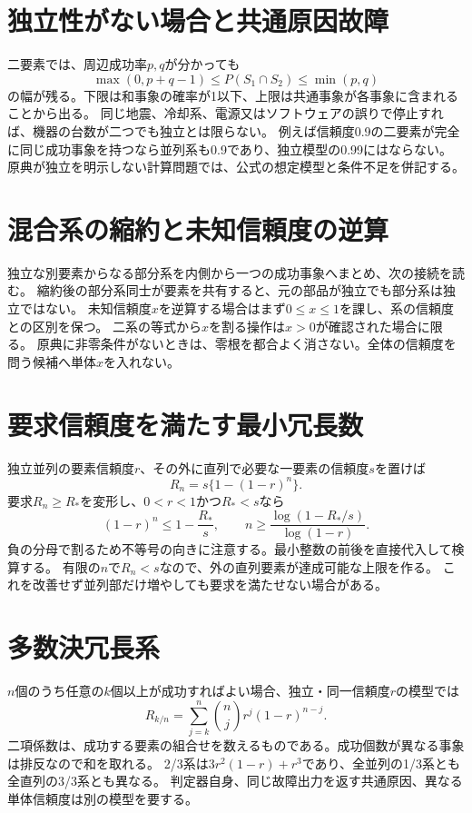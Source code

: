 \section{独立性がない場合と共通原因故障}
\label{theory:dependability:independence}
二要素では、周辺成功率\(p,q\)が分かっても
\[
 \max(0,p+q-1)\le P(S_1\cap S_2)\le\min(p,q)
\]
の幅が残る。下限は和事象の確率が1以下、上限は共通事象が各事象に含まれることから出る。
同じ地震、冷却系、電源又はソフトウェアの誤りで停止すれば、機器の台数が二つでも独立とは限らない。
例えば信頼度0.9の二要素が完全に同じ成功事象を持つなら並列系も0.9であり、独立模型の0.99にはならない。
原典が独立を明示しない計算問題では、公式の想定模型と条件不足を併記する。

\section{混合系の縮約と未知信頼度の逆算}
\label{theory:dependability:mixed}
独立な別要素からなる部分系を内側から一つの成功事象へまとめ、次の接続を読む。
縮約後の部分系同士が要素を共有すると、元の部品が独立でも部分系は独立ではない。
未知信頼度\(x\)を逆算する場合はまず\(0\le x\le1\)を課し、系の信頼度との区別を保つ。
二系の等式から\(x\)を割る操作は\(x>0\)が確認された場合に限る。
原典に非零条件がないときは、零根を都合よく消さない。全体の信頼度を問う候補へ単体\(x\)を入れない。

\section{要求信頼度を満たす最小冗長数}
\label{theory:dependability:redundancy}
独立並列の要素信頼度\(r\)、その外に直列で必要な一要素の信頼度\(s\)を置けば
\[
 R_n=s\{1-(1-r)^n\}.
\]
要求\(R_n\ge R_*\)を変形し、\(0<r<1\)かつ\(R_*<s\)なら
\[
 (1-r)^n\le1-\frac{R_*}{s},\qquad
 n\ge\frac{\log(1-R_*/s)}{\log(1-r)}.
\]
負の分母で割るため不等号の向きに注意する。最小整数の前後を直接代入して検算する。
有限の\(n\)で\(R_n<s\)なので、外の直列要素が達成可能な上限を作る。
これを改善せず並列部だけ増やしても要求を満たせない場合がある。

\section{多数決冗長系}
\label{theory:dependability:voting}
\(n\)個のうち任意の\(k\)個以上が成功すればよい場合、独立・同一信頼度\(r\)の模型では
\[
 R_{k/n}=\sum_{j=k}^{n}\binom{n}{j}r^j(1-r)^{n-j}.
\]
二項係数は、成功する要素の組合せを数えるものである。成功個数が異なる事象は排反なので和を取れる。
2/3系は\(3r^2(1-r)+r^3\)であり、全並列の1/3系とも全直列の3/3系とも異なる。
判定器自身、同じ故障出力を返す共通原因、異なる単体信頼度は別の模型を要する。\cite{reliability_nist_voting}

